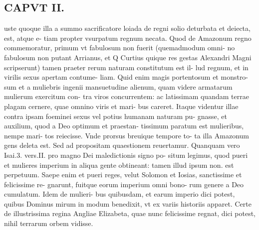\documentclass{article}
\begin{document}
\begin{pages}
\section*{CAPVT  II. }
\marginpar{[ p.85. ]}\pstart uste quoque illa a summo sacrificatore loiada de regni solio deturbata et deiecta, est, atque e- tiam propter vsurpatum regnum necata. Quod de Amazonum regno commemoratur, primum vt fabulosum non fuerit (quemadmodum omni- no fabulosum non putant Arrianus, et Q Curtius quique res gestas Alexandri Magni scripserunt) tamen praeter rerum naturam constitutum est il- lud regnum, et in virilis sexus apertam contume- liam. Quid enim magis portentosum et monstro- sum et a muliebris ingenii mansuetudine alienum, quam videre armatarum mulierum exercitum con- tra viros concurrentem: ac latissimam quandam terrae plagam cernere, quae omnino viris et mari- bus careret. Itaque videntur illae contra ipsam foeminei sexus vel potius humanam naturam pu- gnasse, et auxilium, quod a Deo optimum et praestan- tissimum paratum est mulieribus, nempe mari- tos reiecisse. Vnde prorsus breuique tempore to- ta illa Amazonum gens deleta est. Sed ad propositam quaestionem reuertamur. Quanquam vero Isai.3. vers.II. pro magno Dei maledictionis signo po- situm legimus, quod pueri et mulieres imperium in aliqua gente obtineant: tamen illud ipsum non. est perpetuum. Saepe enim et pueri reges, velut Solomon et Iosias, sanctissime et felicissime re- gnarunt, fuitque eorum imperium omni bono- rum genere a Deo cumulatum. Idem de mulieri- bus quibusdam, et earum imperio dici potest, quibus Dominus mirum in modum benedixit, vt ex variis historiis apparet. Certe de illustrissima regina Angliae Elizabeta, quae nunc felicissime regnat, dici potest, nihil terrarum orbem vidisse.  \pend

\end{pages}
\end{document}
